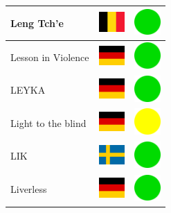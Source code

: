 \documentclass[12pt, a4paper, twoside]{report}
\begin{document}
\begin{center}
\begin{longtable}{|p{5cm}|p{2cm}|p{2cm}|}
 Leng Tch'e                                                 & \includegraphics[width=1cm]{../img/flags/be} &   \includegraphics[width=1cm]{../likes/y} \\ \hline
 Lesson in Violence                                         & \includegraphics[width=1cm]{../img/flags/de} &   \includegraphics[width=1cm]{../likes/y} \\ \hline
 LEYKA                                                      & \includegraphics[width=1cm]{../img/flags/de} &   \includegraphics[width=1cm]{../likes/y} \\ \hline
 Light to the blind                                         & \includegraphics[width=1cm]{../img/flags/de} &   \includegraphics[width=1cm]{../likes/m} \\ \hline
 LIK                                                        & \includegraphics[width=1cm]{../img/flags/se} &   \includegraphics[width=1cm]{../likes/y} \\ \hline
 Liverless                                                  & \includegraphics[width=1cm]{../img/flags/de} &   \includegraphics[width=1cm]{../likes/y} \\ \hline

\end{longtable}
\end{center}
\end{document}
